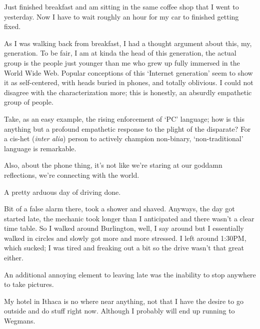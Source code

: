 \documentclass[../butidigress.tex]{subfiles}
\begin{document}
\entryskip

Just finished breakfast and am sitting in the same coffee shop that I went to yesterday.
Now I have to wait roughly an hour for my car to finished getting fixed.

As I was walking back from breakfast, I had a thought argument about this, my, generation.
To be fair, I am at kinda the head of this generation, the actual group is the people just younger than me who grew up fully immersed in the World Wide Web.
Popular conceptions of this `Internet generation' seem to show it as self-centered, with heads buried in phones, and totally oblivious.
I could not disagree with the characterization more; this is honestly, an absurdly empathetic group of people.

Take, as an easy example, the rising enforcement of `PC' language; how is this anything but a profound empathetic response to the plight of the disparate?
For a cis-het (\textit{inter alia}) person to actively champion non-binary, `non-traditional' language is remarkable.

Also, about the phone thing, it's not like we're staring at our goddamn reflections, we're connecting with the world.

\entryskip

A pretty arduous day of driving done.

\entryskip

Bit of a false alarm there, took a shower and shaved.
Anyways, the day got started late, the mechanic took longer than I anticipated and there wasn't a clear time table.
So I walked around Burlington, well, I say around but I essentially walked in circles and slowly got more and more stressed.
I left around 1:30PM, which sucked; I was tired and freaking out a bit so the drive wasn't that great either.

An additional annoying element to leaving late was the inability to stop anywhere to take pictures.

My hotel in Ithaca is no where near anything, not that I have the desire to go outside and do stuff right now.
Although I probably will end up running to Wegmans.
\end{document}
